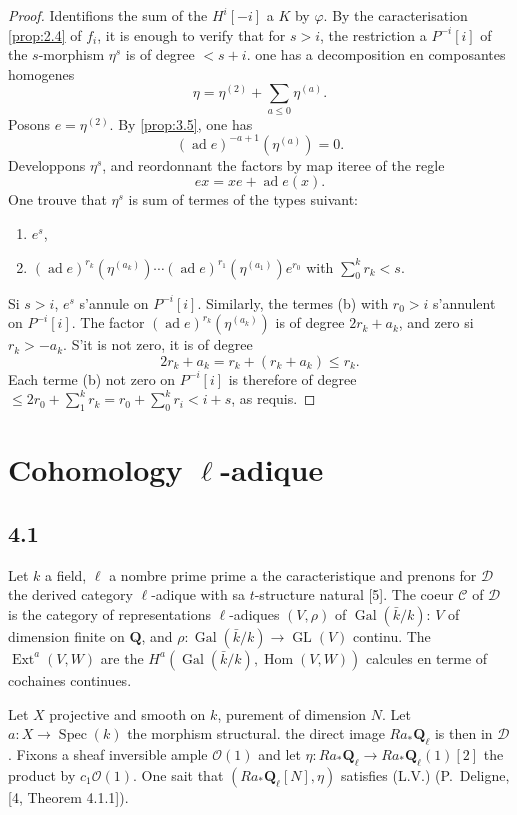 \documentclass[11pt,a4paper]{article}
\theoremstyle{plain}
\theoremstyle{definition}
\DeclareMathOperator{\Ext}{Ext}
\DeclareMathOperator{\Hom}{Hom}
\DeclareMathOperator{\Spec}{Spec}
\DeclareMathOperator{\Gal}{Gal}
\DeclareMathOperator{\GL}{GL}
\newcommand{\cD}{\mathscr{D}}
\newcommand{\cC}{\mathscr{C}}
\newcommand{\bQ}{\mathbf{Q}}
\begin{document}
\begin{proof}
Identifions the sum of the $H^i[-i]$ a $K$ by $\varphi$. By the caracterisation \ref{prop:2.4} of $f_i$, it is enough to verify that for $s > i$, the restriction a $P^{-i}[i]$ of the $s$-morphism $\eta^s$ is of degree $< s+i$. one has a decomposition en composantes homogenes
\[
\eta = \eta^{(2)} + \sum_{a \leqslant 0} \eta^{(a)}.
\]
Posons $e = \eta^{(2)}$. By \ref{prop:3.5}, one has
\[
(\operatorname{ad} e)^{-a+1}(\eta^{(a)}) = 0.
\]
Developpons $\eta^s$, and reordonnant the factors by map iteree of the regle
\[
ex = xe + \operatorname{ad} e(x).
\]
One trouve that $\eta^s$ is sum of termes of the types suivant:
\begin{enumerate}[label=(\alph*)]
\item $e^s$,
\item $(\operatorname{ad} e)^{r_k}(\eta^{(a_k)}) \cdots (\operatorname{ad} e)^{r_1}(\eta^{(a_1)}) e^{r_0}$ with $\sum_0^k r_k < s$.
\end{enumerate}
Si $s > i$, $e^s$ s'annule on $P^{-i}[i]$. Similarly, the termes (b) with $r_0 > i$ s'annulent on $P^{-i}[i]$. The factor $(\operatorname{ad} e)^{r_k}(\eta^{(a_k)})$ is of degree $2r_k + a_k$, and zero si $r_k > -a_k$. S'it is not zero, it is of degree
\[
2r_k + a_k = r_k + (r_k + a_k) \leqslant r_k.
\]
Each terme (b) not zero on $P^{-i}[i]$ is therefore of degree $\leqslant 2r_0 + \sum_1^k r_k = r_0 + \sum_0^k r_i < i + s$, as requis.
\end{proof}

\section{Cohomology $\ell$-adique}

\subsection*{4.1}
Let $k$ a field, $\ell$ a nombre prime prime a the caracteristique and prenons for $\cD$ the derived category $\ell$-adique with sa $t$-structure natural [5]. The coeur $\cC$ of $\cD$ is the category of representations $\ell$-adiques $(V,\rho)$ of $\Gal(\bar{k}/k)$: $V$ of dimension finite on $\bQ$, and $\rho \colon \Gal(\bar{k}/k) \to \GL(V)$ continu. The $\Ext^a(V,W)$ are the $H^a(\Gal(\bar{k}/k), \Hom(V,W))$ calcules en terme of cochaines continues.

Let $X$ projective and smooth on $k$, purement of dimension $N$. Let $a \colon X \to \Spec(k)$ the morphism structural. the direct image $Ra_* \bQ_\ell$ is then in $\cD$. Fixons a sheaf inversible ample $\mathcal{O}(1)$ and let $\eta \colon Ra_* \bQ_\ell \to Ra_* \bQ_\ell(1)[2]$ the product by $c_1 \mathcal{O}(1)$. One sait that $(Ra_* \bQ_\ell[N], \eta)$ satisfies (L.V.) (P.~Deligne, [4, Theorem 4.1.1]).
\end{document}
